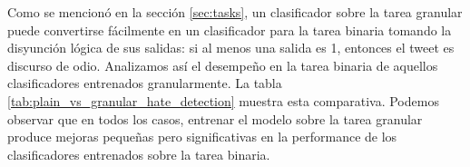 Como se mencionó en la sección \ref{sec:tasks}, un clasificador sobre la tarea granular puede convertirse fácilmente en un clasificador para la tarea binaria tomando la disyunción lógica de sus salidas: si al menos una salida es 1, entonces el tweet es discurso de odio. Analizamos así el desempeño en la tarea binaria de aquellos clasificadores entrenados granularmente. La tabla \ref{tab:plain_vs_granular_hate_detection} muestra esta comparativa. Podemos observar que en todos los casos, entrenar el modelo sobre la tarea granular produce mejoras pequeñas pero significativas en la performance de los clasificadores entrenados sobre la tarea binaria.

